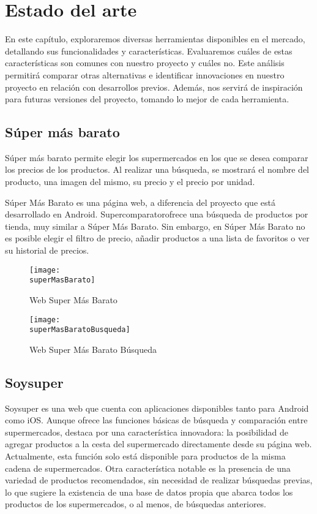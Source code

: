 \documentclass[12pt,twoside,titlepage]{report}
\newcommand{\titulotrabajo}{Supercomparator}
\newcommand{\superMasBarato}{images/super_mas_barato.png}
\newcommand{\superMasBaratoBusqueda}{images/super_más_barato_result.png}
\newcommand\blankpage{%
    \newpage
    \null
    \thispagestyle{empty}%
    \newpage}
\begin{document}
\blankpage


\chapter{Estado del arte}

En este capítulo, exploraremos diversas herramientas disponibles en el mercado, detallando sus funcionalidades y características. Evaluaremos cuáles de estas características son comunes con nuestro proyecto y cuáles no. Este análisis permitirá comparar otras alternativas e identificar innovaciones en nuestro proyecto en relación con desarrollos previos. Además, nos servirá de inspiración para futuras versiones del proyecto, tomando lo mejor de cada herramienta.

\section{Súper más barato}

Súper más barato \cite{Super más barato} permite elegir los supermercados en los que se desea comparar los precios de los productos. Al realizar una búsqueda, se mostrará el nombre del producto, una imagen del mismo, su precio y el precio por unidad.

Súper Más Barato es una página web, a diferencia del proyecto que está desarrollado en Android. \titulotrabajo ofrece una búsqueda de productos por tienda, muy similar a Súper Más Barato. Sin embargo, en Súper Más Barato no es posible elegir el filtro de precio, añadir productos a una lista de favoritos o ver su historial de precios.

\begin{figure}[H]
    \centering
	\texttt{[image: \\superMasBarato]}
    \caption{Web Super Más Barato}
    \label{fig:superMasBarato}
\end{figure}

\begin{figure}[H]
    \centering
	\texttt{[image: \\superMasBaratoBusqueda]}
    \caption{Web Super Más Barato Búsqueda}
    \label{fig:superMasBarato}
\end{figure}

\section{Soysuper}

Soysuper \cite{Soysuper} es una web que cuenta con aplicaciones disponibles tanto para Android como iOS. Aunque ofrece las funciones básicas de búsqueda y comparación entre supermercados, destaca por una característica innovadora: la posibilidad de agregar productos a la cesta del supermercado directamente desde su página web. Actualmente, esta función solo está disponible para productos de la misma cadena de supermercados. Otra característica notable es la presencia de una variedad de productos recomendados, sin necesidad de realizar búsquedas previas, lo que sugiere la existencia de una base de datos propia que abarca todos los productos de los supermercados, o al menos, de búsquedas anteriores.
\end{document}
